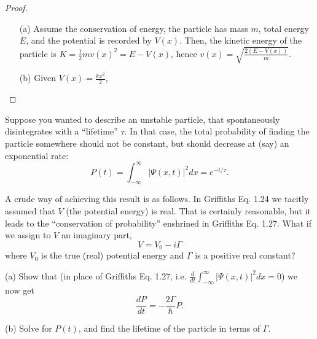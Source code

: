 \documentclass{article}
\begin{document}
\begin{proof}
    \hfill

    \begin{itemize}
        \item[(a)] Assume the conservation of energy, the particle has mass $m$, total energy $E$, and the potential is recorded by $V(x)$. Then, the kinetic energy of the particle is $K=\frac{1}{2}mv(x)^2=E-V(x)$, hence $v(x)=\sqrt{\frac{2(E-V(x))}{m}}$.
        \item[(b)] Given $V(x)=\frac{kx^2}{2}$,  
    \end{itemize}
\end{proof}

\newpage

\begin{ques}\label{q7}
Suppose you wanted to describe an unstable particle, that spontaneously disintegrates with
a “lifetime” $\tau$. In that case, the total probability of finding the particle somewhere should
not be constant, but should decrease at (say) an exponential rate:
\[
P (t) = \int_{-\infty}^{\infty} |\Psi(x, t)|^2 dx = e^{-t/\tau}.
\]

A crude way of achieving this result is as follows. In Griffiths Eq. 1.24 we tacitly assumed
that $V$ (the potential energy) is real. That is certainly reasonable, but it leads to the
“conservation of probability” enshrined in Griffiths Eq. 1.27. What if we assign to $V$ an
imaginary part,
\[
V = V_0 - i\Gamma
\]
where $V_0$ is the true (real) potential energy and $\Gamma$ is a positive real constant?

(a) Show that (in place of Griffiths Eq. 1.27, i.e.
$\tfrac{d}{dt}\int_{-\infty}^\infty |\Psi(x, t)|^2dx = 0$) we now get
\[
\frac{dP}{dt} = -\frac{2\Gamma}{\hbar}P.
\]

(b) Solve for $P(t)$, and find the lifetime of the particle in terms of $\Gamma$.
\end{ques}
\end{document}

